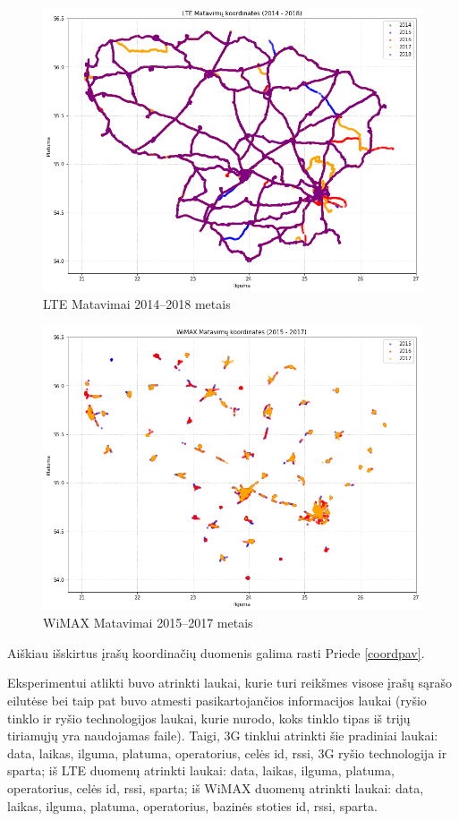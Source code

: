 \documentclass{VUMIFPSbakalaurinis}
\begin{document}
\begin{figure}[H]
	\centering
	\includegraphics[scale=0.5]{img/LTE-0}
	\caption{LTE Matavimai 2014–2018 metais}
	\label{img:LTE-0}
\end{figure}
\begin{figure}[H]
	\centering
	\includegraphics[scale=0.5]{img/WiMAX-0}
	\caption{WiMAX Matavimai 2015–2017 metais}
	\label{img:WiMAX-0}
\end{figure}
Aiškiau išskirtus įrašų koordinačių duomenis galima rasti Priede \ref{coordpav}.


 \label{subsubsubsec:paruošimas1}
Eksperimentui atlikti buvo atrinkti laukai, kurie turi reikšmes visose įrašų sąrašo eilutėse bei taip pat buvo atmesti pasikartojančios informacijos laukai (ryšio tinklo ir ryšio technologijos laukai, kurie nurodo, koks tinklo tipas iš trijų tiriamųjų yra naudojamas faile). Taigi, 3G tinklui atrinkti šie pradiniai laukai: data, laikas, ilguma, platuma, operatorius, celės id, rssi, 3G ryšio technologija ir sparta; iš LTE duomenų atrinkti laukai: data, laikas, ilguma, platuma, operatorius, celės id, rssi, sparta; iš WiMAX duomenų atrinkti laukai: data, laikas, ilguma, platuma, operatorius, bazinės stoties id, rssi, sparta.\par
\end{document}
